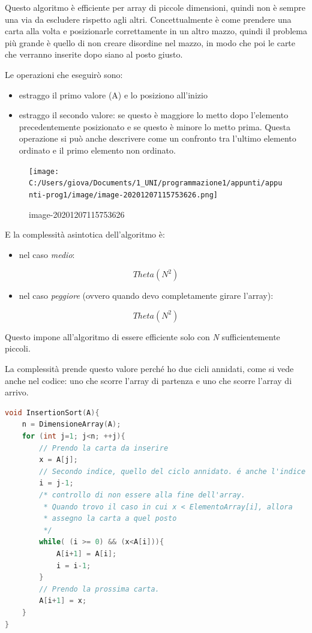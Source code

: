 \documentclass[
  paper=a4,
  oneside  ,captions=tableheading
]{scrbook}
\providecommand{\tightlist}{%
  \setlength{\itemsep}{0pt}\setlength{\parskip}{0pt}}
\begin{document}
Questo algoritmo è efficiente per array di piccole dimensioni, quindi
non è sempre una via da escludere rispetto agli altri. Concettualmente è
come prendere una carta alla volta e posizionarle correttamente in un
altro mazzo, quindi il problema più grande è quello di non creare
disordine nel mazzo, in modo che poi le carte che verranno inserite dopo
siano al posto giusto.

Le operazioni che eseguirò sono:

\begin{itemize}
\tightlist
\item
  estraggo il primo valore (A) e lo posiziono all'inizio
\item
  estraggo il secondo valore: se questo è maggiore lo metto dopo
  l'elemento precedentemente posizionato e se questo è minore lo metto
  prima. Questa operazione si può anche descrivere come un confronto tra
  l'ultimo elemento ordinato e il primo elemento non ordinato.
\end{itemize}

\begin{figure}
\centering
\texttt{[image: C:/Users/giova/Documents/1\_UNI/programmazione1/appunti/appunti-prog1/image/image-20201207115753626.png]}
\caption{image-20201207115753626}
\end{figure}

E la complessità asintotica dell'algoritmo è:

\begin{itemize}
\tightlist
\item
  nel caso \emph{medio}:
\end{itemize}

\[
Theta(N^2)
\]

\begin{itemize}
\tightlist
\item
  nel caso \emph{peggiore} (ovvero quando devo completamente girare
  l'array):
\end{itemize}

\[
Theta(N^2)
\]

Questo impone all'algoritmo di essere efficiente solo con \emph{N}
sufficientemente piccoli.

La complessità prende questo valore perché ho due cicli annidati, come
si vede anche nel codice: uno che scorre l'array di partenza e uno che
scorre l'array di arrivo.

\begin{lstlisting}[language={C++}]
void InsertionSort(A){
    n = DimensioneArray(A);
    for (int j=1; j<n; ++j){
        // Prendo la carta da inserire
        x = A[j];
        // Secondo indice, quello del ciclo annidato. é anche l'indice superiore, che indica il sottoArray tra 0->(j-1).
        i = j-1;
        /* controllo di non essere alla fine dell'array.
         * Quando trovo il caso in cui x < ElementoArray[i], allora
         * assegno la carta a quel posto
         */
        while( (i >= 0) && (x<A[i])){
            A[i+1] = A[i];
            i = i-1;
        }
        // Prendo la prossima carta.
        A[i+1] = x;
    }
}
\end{lstlisting}
\end{document}
